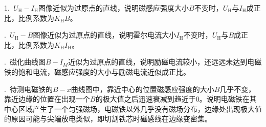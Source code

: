 \documentclass[a4paper,fontset=windows]{ctexart}
\begin{document}
    1.\ $U_\mathrm{H}-I_\mathrm{H}$图像近似为过原点的直线，说明磁感应强度大小$B$不变时，$U_\mathrm{H}$与$I_\mathrm{H}$成正比，比例系数为$K_\mathrm{H} B$。

    .\ $U_\mathrm{H}-B$图像近似为过原点的直线，说明霍尔电流大小$I_\mathrm{H}$不变时，$U_\mathrm{H}$与$B$成正比，比例系数为$K_\mathrm{H} I_\mathrm{H}$。

    .\ 磁化曲线图$B-I_M$近似为过原点的直线，说明励磁电流较小，还远远未达到电磁铁的饱和电流，磁感应强度的大小与励磁电流近似成正比。

    .\ 待测电磁铁的$B-x$曲线图中，靠近中心的位置磁感应强度的大小$B$几乎不变，靠近边缘的位置在出现一个$B$的极大值之后迅速衰减到趋近于0。说明电磁铁在其中心区域产生了一个匀强磁场，电磁铁以外几乎没有磁场分布，边缘处出现极大值的原因可能与尖端放电类似，即切割铁芯时磁感线在边缘变密集。
\end{document}
